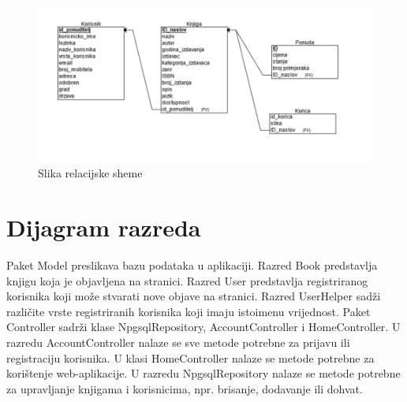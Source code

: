 		\begin{figure}[hbt!]
			\centering
			\includegraphics[width = \textwidth]{slike/Relacijska shema}
			\caption{Slika relacijske sheme}
			\label{fig:enter-label}
		\end{figure}
		
		\eject
			
		\section{Dijagram razreda}
		
			\raggedright{Paket Model preslikava bazu podataka u aplikaciji. Razred Book predstavlja knjigu koja je objavljena na stranici. Razred User predstavlja registriranog korisnika koji može stvarati nove objave na stranici. Razred UserHelper sadži različite vrste registriranih korisnika koji imaju istoimenu vrijednost. Paket Controller sadrži klase NpgsqlRepository, AccountController i HomeController. U razredu AccountController nalaze se sve metode potrebne za prijavu ili registraciju korisnika. U klasi HomeController nalaze se metode potrebne za korištenje web-aplikacije. U razredu NpgsqlRepository nalaze se metode potrebne za upravljanje knjigama i korisnicima, npr. brisanje, dodavanje ili dohvat.}\\
			
			\clearpage
			
